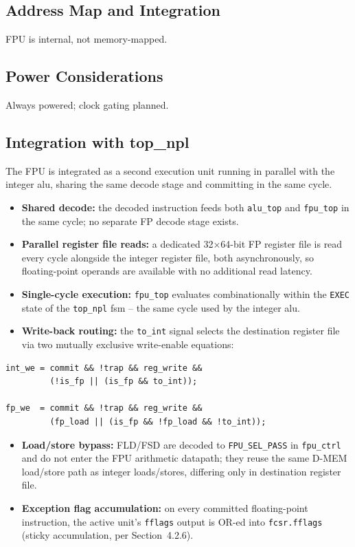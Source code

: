 \subsection{Address Map and Integration}
FPU is internal, not memory-mapped.

\subsection{Power Considerations}
Always powered; clock gating planned.

\subsection{Integration with top\_npl}
The FPU is integrated as a second execution unit running in parallel with
the integer \gls{alu}, sharing the same decode stage and committing in the
same cycle.

\begin{itemize}
    \item \textbf{Shared decode:} the decoded instruction feeds both
          \texttt{alu\_top} and \texttt{fpu\_top} in the same cycle; no
          separate FP decode stage exists.
    \item \textbf{Parallel register file reads:} a dedicated 32$\times$64-bit
          FP register file is read every cycle alongside the integer
          register file, both asynchronously, so floating-point operands
          are available with no additional read latency.
    \item \textbf{Single-cycle execution:} \texttt{fpu\_top} evaluates
          combinationally within the \texttt{EXEC} state of the
          \texttt{top\_npl} \gls{fsm} -- the same cycle used by the integer
          \gls{alu}.
    \item \textbf{Write-back routing:} the \texttt{to\_int} signal selects
          the destination register file via two mutually exclusive
          write-enable equations:
\end{itemize}

\begin{verbatim}
int_we = commit && !trap && reg_write &&
         (!is_fp || (is_fp && to_int));

fp_we  = commit && !trap && reg_write &&
         (fp_load || (is_fp && !fp_load && !to_int));
\end{verbatim}

\begin{itemize}
    \item \textbf{Load/store bypass:} FLD/FSD are decoded to
          \texttt{FPU\_SEL\_PASS} in \texttt{fpu\_ctrl} and do not enter the
          FPU arithmetic datapath; they reuse the same \gls{D-MEM}
          load/store path as integer loads/stores, differing only in
          destination register file.
    \item \textbf{Exception flag accumulation:} on every committed
          floating-point instruction, the active unit's \texttt{fflags}
          output is OR-ed into \texttt{fcsr.fflags} (sticky accumulation,
          per Section~4.2.6).
\end{itemize}

